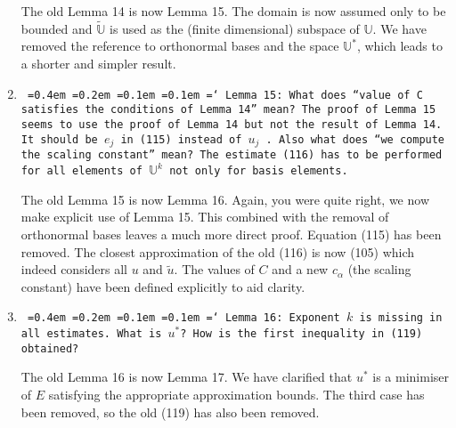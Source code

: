 \documentclass[12pt]{article}
\newcommand*\justify{%
	\fontdimen2\font=0.4em%
	\fontdimen3\font=0.2em%
	\fontdimen4\font=0.1em%
	\fontdimen7\font=0.1em%
	\hyphenchar\font=`\-%
}
\newcommand{\review}[1]{\texttt{\justify{#1}}}
\newcommand{\F}[1]{\mathbb{#1}}
\begin{document}
\begin{enumerate}
	The old Lemma 14 is now Lemma 15. The domain is now assumed only to be bounded and $\tilde{\F{U}}$ is used as the (finite dimensional) subspace of $\F U$. We have removed the reference to orthonormal bases and the space $\F{U}^*$, which leads to a shorter and simpler result. 
		
	\item \review{Lemma 15: What does ``value of $C$ satisfies the conditions of Lemma 14'' mean? The proof of Lemma 15 seems to use the proof of Lemma 14 but not the result of Lemma 14. It should be $e_j$ in (115) instead of $u_j$ . Also what does ``we compute the scaling constant'' mean? The estimate (116) has to be performed for all elements of $\mathbb U^k$ not only for basis elements.}
	
	The old Lemma 15 is now Lemma 16. Again, you were quite right, we now make explicit use of Lemma 15. This combined with the removal of orthonormal bases leaves a much more direct proof. Equation (115) has been removed. The closest approximation of the old (116) is now (105) which indeed considers all $u$ and $\tilde{u}$. The values of $C$ and a new $c_\alpha$ (the scaling constant) have been defined explicitly to aid clarity.
	
	\item \review{Lemma 16: Exponent $k$ is missing in all estimates. What is $u^*$? How is the first inequality in (119) obtained?}
	
	The old Lemma 16 is now Lemma 17. We have clarified that $u^*$ is a minimiser of $E$ satisfying the appropriate approximation bounds. The third case has been removed, so the old (119) has also been removed.
\end{enumerate}
\end{document}
